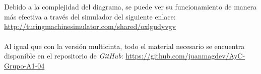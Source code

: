 \documentclass[11pt, a4paper]{exam}
\begin{document}
\begin{questions}
\begin{parts}
\begin{solution}
            \\
            \\
            Debido a la complejidad del diagrama, se puede ver su funcionamiento de manera más efectiva a través del simulador del siguiente enlace: \url{http://turingmachinesimulator.com/shared/oxlgudyvgv}
            \\
            \\
            Al igual que con la versión multicinta, todo el material necesario se encuentra disponible en el repositorio de \textit{GitHub}: \url{https://github.com/juanmagdev/AyC-Grupo-A1-04}
        \end{solution}
    \end{parts}

\end{questions}



\end{document}
